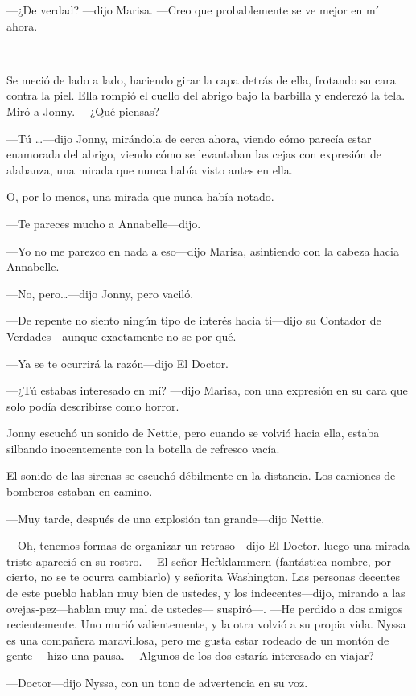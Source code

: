 ---¿De verdad? ---dijo Marisa. ---Creo que probablemente se ve mejor en
mí ahora.

~

Se meció de lado a lado, haciendo girar la capa detrás de ella, frotando
su cara contra la piel. Ella rompió el cuello del abrigo bajo la
barbilla y enderezó la tela. Miró a Jonny. ---¿Qué piensas?

---Tú \ldots{}---dijo Jonny, mirándola de cerca ahora, viendo cómo
parecía estar enamorada del abrigo, viendo cómo se levantaban las cejas
con expresión de alabanza, una mirada que nunca había visto antes en
ella.

O, por lo menos, una mirada que nunca había notado.

---Te pareces mucho a Annabelle---dijo.

---Yo no me parezco en nada a eso---dijo Marisa, asintiendo con la
cabeza hacia Annabelle.

---No, pero\ldots{}---dijo Jonny, pero vaciló.

---De repente no siento ningún tipo de interés hacia ti---dijo su
Contador de Verdades---aunque exactamente no se por qué.

---Ya se te ocurrirá la razón---dijo El Doctor.

---¿Tú estabas interesado en mí? ---dijo Marisa, con una expresión en su
cara que solo podía describirse como horror.

Jonny escuchó un sonido de Nettie, pero cuando se volvió hacia ella,
estaba silbando inocentemente con la botella de refresco vacía.

El sonido de las sirenas se escuchó débilmente en la distancia. Los
camiones de bomberos estaban en camino.

---Muy tarde, después de una explosión tan grande---dijo Nettie.

---Oh, tenemos formas de organizar un retraso---dijo El Doctor. luego
una mirada triste apareció en su rostro. ---El señor Heftklammern
(fantástica nombre, por cierto, no se te ocurra cambiarlo) y señorita
Washington. Las personas decentes de este pueblo hablan muy bien de
ustedes, y los indecentes---dijo, mirando a las ovejas-pez---hablan muy
mal de ustedes--- suspiró---. ---He perdido a dos amigos recientemente.
Uno murió valientemente, y la otra volvió a su propia vida. Nyssa es una
compañera maravillosa, pero me gusta estar rodeado de un montón de
gente--- hizo una pausa. ---Algunos de los dos estaría interesado en
viajar?

---Doctor---dijo Nyssa, con un tono de advertencia en su voz.

